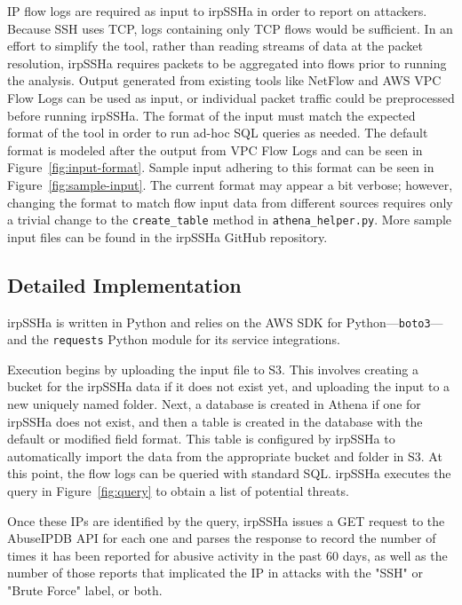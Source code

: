 IP flow logs are required as input to irpSSHa in order to report on attackers. Because SSH uses TCP, logs containing only TCP flows would be sufficient. In an effort to simplify the tool, rather than reading streams of data at the packet resolution, irpSSHa requires packets to be aggregated into flows prior to running the analysis. Output generated from existing tools like NetFlow and AWS VPC Flow Logs can be used as input, or individual packet traffic could be preprocessed before running irpSSHa. The format of the input must match the expected format of the tool in order to run ad-hoc SQL queries as needed. The default format is modeled after the output from VPC Flow Logs and can be seen in Figure~\ref{fig:input-format}. Sample input adhering to this format can be seen in Figure~\ref{fig:sample-input}. The current format may appear a bit verbose; however, changing the format to match flow input data from different sources requires only a trivial change to the \texttt{create\_table} method in \texttt{athena\_helper.py}. More sample input files can be found in the irpSSHa GitHub repository. 


\subsection{Detailed Implementation}

irpSSHa is written in Python and relies on the AWS SDK for Python---\texttt{boto3}---and the \texttt{requests} Python module for its service integrations. 

Execution begins by uploading the input file to S3. This involves creating a bucket for the irpSSHa data if it does not exist yet, and uploading the input to a new uniquely named folder. Next, a database is created in Athena if one for irpSSHa does not exist, and then a table is created in the database with the default or modified field format. This table is configured by irpSSHa to automatically import the data from the appropriate bucket and folder in S3. At this point, the flow logs can be queried with standard SQL. irpSSHa executes the query in Figure~\ref{fig:query} to obtain a list of potential threats.

Once these IPs are identified by the query, irpSSHa issues a GET request to the AbuseIPDB API for each one and parses the response to record the number of times it has been reported for abusive activity in the past 60 days, as well as the number of those reports that implicated the IP in attacks with the "SSH" or "Brute Force" label, or both. 


